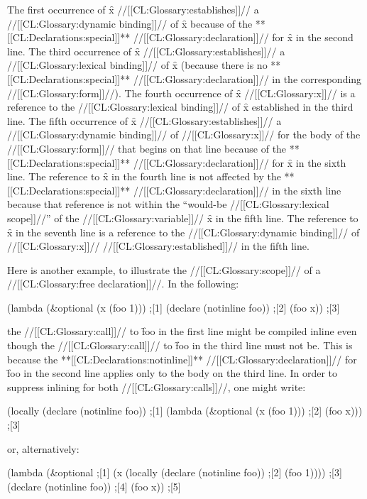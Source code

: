The first occurrence of \f{x} //[[CL:Glossary:establishes]]// a //[[CL:Glossary:dynamic binding]]//
of \f{x} because of the **[[CL:Declarations:special]]** //[[CL:Glossary:declaration]]// for \f{x}
in the second line.  The third occurrence of \f{x} //[[CL:Glossary:establishes]]// a
//[[CL:Glossary:lexical binding]]// of \f{x} (because there is no **[[CL:Declarations:special]]**
//[[CL:Glossary:declaration]]// in the corresponding  //[[CL:Glossary:form]]//).
The fourth occurrence of \f{x} //[[CL:Glossary:x]]// is a reference to the
//[[CL:Glossary:lexical binding]]// of \f{x} established in the third line.
The fifth occurrence of \f{x} //[[CL:Glossary:establishes]]// a //[[CL:Glossary:dynamic binding]]//
of //[[CL:Glossary:x]]// for the body of the  //[[CL:Glossary:form]]// that begins on
that line because of the **[[CL:Declarations:special]]** //[[CL:Glossary:declaration]]// for \f{x}
in the sixth line. The reference to \f{x} in the fourth line is not
affected by the **[[CL:Declarations:special]]** //[[CL:Glossary:declaration]]// in the sixth line 
because that reference is not within the ``would-be //[[CL:Glossary:lexical scope]]//''
of the //[[CL:Glossary:variable]]// \f{x} in the fifth line.  The reference to \f{x}
in the seventh line is a reference to the //[[CL:Glossary:dynamic binding]]// of //[[CL:Glossary:x]]//
//[[CL:Glossary:established]]// in the fifth line.


Here is another example, to illustrate the //[[CL:Glossary:scope]]// of a
//[[CL:Glossary:free declaration]]//.  In the following:

\code
 (lambda (&optional (x (foo 1))) ;[1]
   (declare (notinline foo))     ;[2]
   (foo x))                      ;[3]
\endcode

the //[[CL:Glossary:call]]// to \f{foo} in the first line might be 
compiled inline even though the //[[CL:Glossary:call]]// to \f{foo} in
the third line must not be.  This is because
the **[[CL:Declarations:notinline]]** //[[CL:Glossary:declaration]]//
for \f{foo} in the second line applies only to the body on the
third line.  In order to suppress inlining for both //[[CL:Glossary:calls]]//, 
one might write:

\code
 (locally (declare (notinline foo)) ;[1]
   (lambda (&optional (x (foo 1)))  ;[2]
     (foo x)))                      ;[3]
\endcode

or, alternatively:

\code
 (lambda (&optional                               ;[1]
            (x (locally (declare (notinline foo)) ;[2]
                 (foo 1))))                       ;[3]
   (declare (notinline foo))                      ;[4]
   (foo x))                                       ;[5]
\endcode


